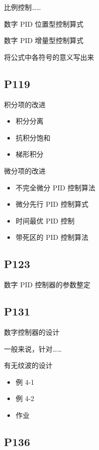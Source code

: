 \documentclass[zihao=-4
]{ctexart}%
\begin{document}
比例控制\ldots\ldots{}

数字 PID 位置型控制算式

数字 PID 增量型控制算式

将公式中各符号的意义写出来

\hypertarget{header-n187}{%
\subsection{P119}\label{header-n187}}

积分项的改进

\begin{itemize}
\item
  积分分离
\item
  抗积分饱和
\item
  梯形积分
\end{itemize}

微分项的改进

\begin{itemize}
\item
  不完全微分 PID 控制算法
\item
  微分先行 PID 控制算式
\item
  时间最优 PID 控制
\item
  带死区的 PID 控制算法
\end{itemize}

\hypertarget{header-n206}{%
\subsection{P123}\label{header-n206}}

数字 PID 控制器的参数整定

\hypertarget{header-n208}{%
\subsection{P131}\label{header-n208}}

数字控制器的设计

一般来说，针对\ldots\ldots{}

有无纹波的设计

\begin{itemize}
\item
  例 4-1
\item
  例 4-2
\item
  作业
\end{itemize}

\hypertarget{header-n219}{%
\subsection{P136}\label{header-n219}}
\end{document}
